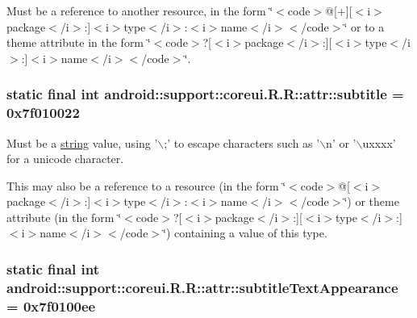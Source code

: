 Must be a reference to another resource, in the form \char`\"{}$<$code$>$@\mbox{[}+\mbox{]}\mbox{[}$<$i$>$package$<$/i$>$:\mbox{]}$<$i$>$type$<$/i$>$:$<$i$>$name$<$/i$>$$<$/code$>$\char`\"{} or to a theme attribute in the form \char`\"{}$<$code$>$?\mbox{[}$<$i$>$package$<$/i$>$:\mbox{]}\mbox{[}$<$i$>$type$<$/i$>$:\mbox{]}$<$i$>$name$<$/i$>$$<$/code$>$\char`\"{}. \hypertarget{classandroid_1_1support_1_1coreui_1_1_r_1_1attr_397df8e6a0ab9fde9ea77a752ea712de}{
\subsubsection[{subtitle}]{\setlength{\rightskip}{0pt plus 5cm}static final int android::support::coreui.R.R::attr::subtitle = 0x7f010022}}
\label{classandroid_1_1support_1_1coreui_1_1_r_1_1attr_397df8e6a0ab9fde9ea77a752ea712de}


Must be a \hyperlink{classandroid_1_1support_1_1coreui_1_1_r_1_1string}{string} value, using '$\backslash$;' to escape characters such as '$\backslash$n' or '$\backslash$uxxxx' for a unicode character. 

This may also be a reference to a resource (in the form \char`\"{}$<$code$>$@\mbox{[}$<$i$>$package$<$/i$>$:\mbox{]}$<$i$>$type$<$/i$>$:$<$i$>$name$<$/i$>$$<$/code$>$\char`\"{}) or theme attribute (in the form \char`\"{}$<$code$>$?\mbox{[}$<$i$>$package$<$/i$>$:\mbox{]}\mbox{[}$<$i$>$type$<$/i$>$:\mbox{]}$<$i$>$name$<$/i$>$$<$/code$>$\char`\"{}) containing a value of this type. \hypertarget{classandroid_1_1support_1_1coreui_1_1_r_1_1attr_4f95543ebba9f8ed2c77f44efb0826cb}{
\subsubsection[{subtitleTextAppearance}]{\setlength{\rightskip}{0pt plus 5cm}static final int android::support::coreui.R.R::attr::subtitleTextAppearance = 0x7f0100ee}}
\label{classandroid_1_1support_1_1coreui_1_1_r_1_1attr_4f95543ebba9f8ed2c77f44efb0826cb}


